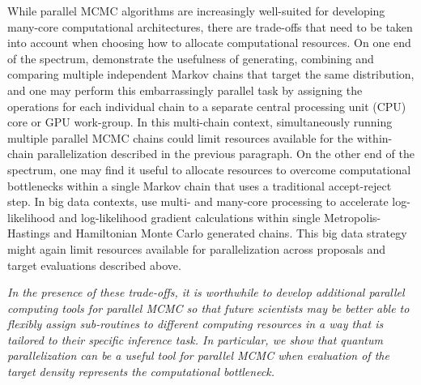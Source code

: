 \documentclass[12pt]{article} %
\begin{document}
While parallel MCMC algorithms are increasingly well-suited for developing many-core computational architectures, there are trade-offs that need to be taken into account when choosing how to allocate computational resources.  On one end of the spectrum, \citet{gelman1992inference} demonstrate the usefulness of generating, combining and comparing multiple independent Markov chains that target the same distribution, and one may perform this embarrassingly parallel task by assigning the operations for each individual chain to a separate central processing unit (CPU) core or GPU work-group.  In this multi-chain context, simultaneously running multiple parallel MCMC chains could limit resources available for the within-chain parallelization described in the previous paragraph.  On the other end of the spectrum, one may find it useful to allocate resources to overcome computational bottlenecks within a single Markov chain that uses a traditional accept-reject step. In big data contexts, \citet{holbrook2021viral,massive,holbrook2021scalable} use multi- and many-core processing to accelerate log-likelihood and log-likelihood gradient calculations within single Metropolis-Hastings and Hamiltonian Monte Carlo \citep{neal2011mcmc} generated chains.  This big data strategy might again limit resources available for parallelization across proposals and target evaluations described above.

\emph{In the presence of these trade-offs, it is worthwhile to develop additional parallel computing tools for parallel MCMC so that future scientists may be better able to flexibly assign sub-routines to different computing resources in a way that is tailored to their specific inference task.  In particular, we show that quantum parallelization can be a useful tool for parallel MCMC when evaluation of the target density represents the computational bottleneck.}
\end{document}
